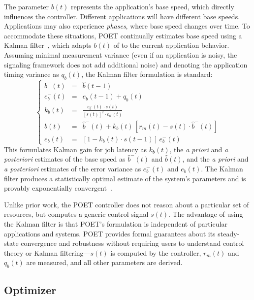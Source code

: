 The parameter $b(t)$ represents the application's base speed, which directly influences the controller.
Different applications will have different base speeds.
Applications may also experience \emph{phases}, where base speed changes over time.
To accommodate these situations, POET continually estimates base speed using a Kalman filter~\cite{welch2006kalman}, which adapts $b(t)$ of  to the current application behavior.
Assuming minimal measurement variance (\ie even if an application is noisy, the signaling framework does not add additional noise) and denoting the application timing variance as $q_b(t)$, the Kalman filter formulation is standard:
\begin{equation}
\left \lbrace
\begin{array}{rcl}
\hat{b}^{-}(t) & = & \hat{b}(t-1) \\
e^{-}_{b}(t) & = & e_{b}(t-1) + q_b(t) \\
k_b(t) 
  & = & \frac{e^{-}_{b}(t) \cdot s(t)}{[s(t)]^2
        \cdot e^{-}_{b}(t)} \\
\hat{b}(t) 
  & = & \hat{b}^{-}(t) + k_b(t) 
        \, \left[ r_m(t) - s(t) \cdot \hat{b}^{-}(t) \right] \\
e_{b}(t) & = & [1 - k_b(t) \cdot s(t-1)] \, e^{-}_{b}(t)
\end{array}
\right .
\label{eqn:kalman-filter}
\end{equation}
This formulates Kalman gain for job latency as $k_b(t)$, the \emph{a priori} and \emph{a posteriori} estimates of the base speed as $\hat{b}^{-}(t)$ and $\hat{b}(t)$, and the \emph{a priori} and \emph{a posteriori} estimates of the error variance as $e^{-}_{b}(t)$ and $e_{b}(t)$.
The Kalman filter produces a statistically optimal estimate of the system's parameters and is provably exponentially convergent~\cite{CaoSchwartz2003}.

Unlike prior work, the POET controller does not reason about a particular set of resources, but computes a generic control signal $s(t)$.
The advantage of using the Kalman filter is that POET's formulation is independent of particular applications and systems.
POET provides formal guarantees about its steady-state convergence and robustness without requiring users to understand control theory or Kalman filtering---$s(t)$ is computed by the controller, $r_m(t)$ and $q_b(t)$ are measured, and all other parameters are derived.


\subsection{Optimizer}
\label{sec:poet-optimizer}

